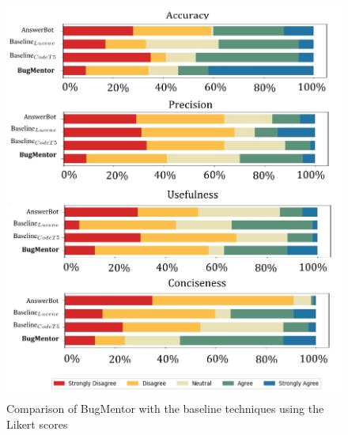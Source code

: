 \begin{figure}[!t]
	\centering
 \includegraphics[width=\textwidth,keepaspectratio]{images/user_study_graph.png}
	\caption{Comparison of BugMentor with the baseline techniques using the Likert scores}
	\label{fig:dev}
\end{figure}

